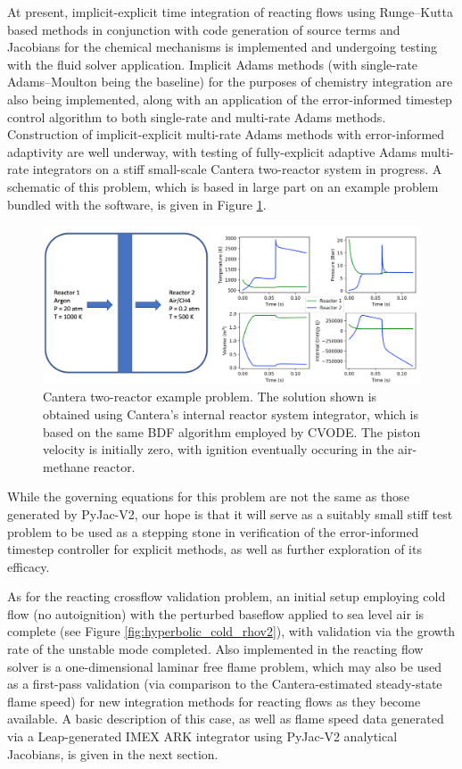 At present, implicit-explicit time integration of reacting flows using Runge--Kutta
based methods in conjunction with code generation of source terms and Jacobians for
the chemical mechanisms is implemented and undergoing testing with the fluid solver
application. Implicit Adams methods (with single-rate Adams--Moulton being the baseline)
for the purposes of chemistry integration are also being implemented, along with
an application of the error-informed timestep control algorithm to both
single-rate and multi-rate Adams methods. Construction of implicit-explicit multi-rate
Adams methods with error-informed adaptivity are well underway, with testing
of fully-explicit adaptive Adams multi-rate integrators on a stiff small-scale Cantera
\cite{cantera} two-reactor system in progress. A schematic of this problem, which is
based in large part on an example problem bundled with the software, is given in
Figure \ref{fig:cantera_reactors}.
\begin{figure}
\centering
\includegraphics[width=0.9\linewidth,trim=4 4 4 4,clip]{figures/cantera_reactors_soln.png}
\caption{Cantera two-reactor example problem. The solution shown is obtained using
	 Cantera's internal reactor system integrator, which is based on the same
	 BDF algorithm employed by CVODE. The piston velocity is initially zero,
	 with ignition eventually occuring in the air-methane reactor.}
\label{fig:cantera_reactors}
\end{figure}
While the governing equations for this problem are not the same as those generated
by PyJac-V2, our hope is that it will serve as a suitably small stiff test problem to be
used as a stepping stone in verification of the error-informed timestep controller
for explicit methods, as well as further exploration of its efficacy.

As for the reacting crossflow validation problem, an initial setup employing
cold flow (no autoignition) with the perturbed baseflow applied to sea level air
is complete (see Figure \ref{fig:hyperbolic_cold_rhov2}), with validation via the
growth rate of the unstable mode completed. Also implemented in the reacting flow
solver is a one-dimensional laminar free flame problem, which may also be used
as a first-pass validation (via comparison to the Cantera-estimated steady-state
flame speed) for new integration methods for reacting flows as they become available.
A basic description of this case, as well as flame speed data generated via a Leap-generated
IMEX ARK integrator using PyJac-V2 analytical Jacobians, is given in the next section.

